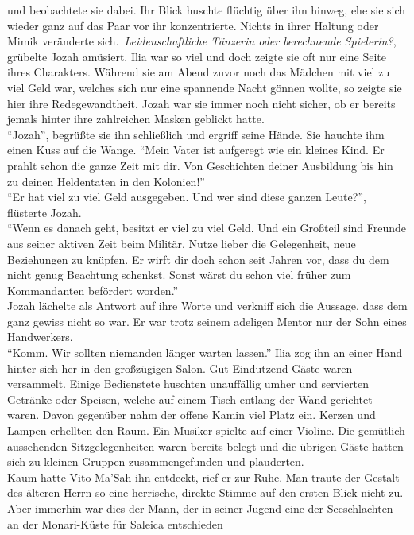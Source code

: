 und beobachtete sie dabei. Ihr Blick huschte flüchtig über ihn hinweg, ehe sie sich wieder ganz auf 
das Paar vor ihr konzentrierte. Nichts in ihrer Haltung oder Mimik veränderte sich.\
\textit{Leidenschaftliche Tänzerin oder berechnende Spielerin?}, grübelte Jozah amüsiert. Ilia war 
so viel und doch zeigte sie oft nur eine Seite ihres Charakters. Während sie am Abend zuvor noch 
das Mädchen mit viel zu viel Geld war, welches sich nur eine spannende Nacht gönnen wollte, so 
zeigte sie hier ihre Redegewandtheit. Jozah war sie immer noch nicht sicher, ob er bereits jemals 
hinter ihre zahlreichen Masken geblickt hatte.\\ 
``Jozah'', begrüßte sie ihn schließlich und ergriff seine Hände. Sie hauchte ihm einen Kuss auf die 
Wange. ``Mein Vater ist aufgeregt wie ein kleines Kind. Er prahlt schon die ganze Zeit mit dir. Von 
Geschichten deiner Ausbildung bis hin zu deinen Heldentaten in den Kolonien!''\\
``Er hat viel zu viel Geld ausgegeben. Und wer sind diese ganzen Leute?'', flüsterte Jozah.\\
``Wenn es danach geht, besitzt er viel zu viel Geld. Und ein Großteil sind Freunde aus seiner 
aktiven Zeit beim Militär. Nutze lieber die Gelegenheit, neue Beziehungen zu knüpfen. Er wirft dir 
doch schon seit Jahren vor, dass du dem nicht genug Beachtung schenkst. Sonst wärst du schon viel 
früher zum Kommandanten befördert worden.''\\
Jozah lächelte als Antwort auf ihre Worte und verkniff sich die Aussage, dass dem ganz gewiss nicht 
so war. Er war trotz seinem adeligen Mentor nur der Sohn eines Handwerkers.\\
``Komm. Wir sollten niemanden länger warten lassen.'' Ilia zog ihn an einer Hand hinter sich her in 
den großzügigen Salon. Gut Eindutzend Gäste waren versammelt. Einige Bedienstete huschten 
unauffällig umher und servierten Getränke oder Speisen, welche auf einem Tisch entlang der Wand 
gerichtet waren. Davon gegenüber nahm der offene Kamin viel Platz ein. Kerzen und Lampen erhellten 
den Raum. Ein Musiker spielte auf einer Violine. Die gemütlich aussehenden Sitzgelegenheiten waren 
bereits belegt und die übrigen Gäste hatten sich zu kleinen Gruppen zusammengefunden und 
plauderten.\\
Kaum hatte Vito Ma'Sah ihn entdeckt, rief er zur Ruhe. Man traute der Gestalt des älteren Herrn so 
eine herrische, direkte Stimme auf den ersten Blick nicht zu. Aber immerhin war dies der 
Mann, der in seiner Jugend eine der Seeschlachten an der Monari-Küste für Saleica entschieden 
